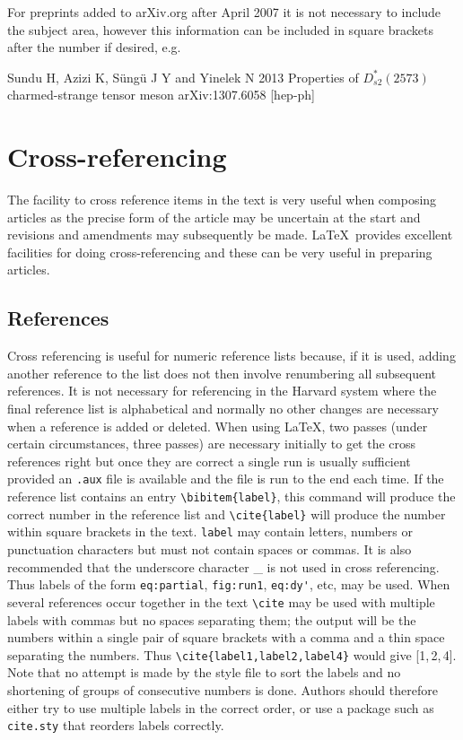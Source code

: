 \documentclass[12pt]{iopart}
\begin{document}
\noindent For preprints added to arXiv.org after April 2007 it is not necessary to include the subject area, however this information can be included in square brackets after the number if desired, e.g.
\item Sundu H, Azizi K, S\"ung\"u J Y and Yinelek N 2013 Properties of $D_{s2}^*(2573)$ charmed-strange tensor meson arXiv:1307.6058 [hep-ph]
\endnumrefs

\section{Cross-referencing\label{xrefs}}
The facility to cross reference items in the text is very useful when
composing articles as the precise form of the article may be uncertain at the start
and  revisions and amendments may subsequently be made.
\LaTeX\ provides excellent facilities for doing cross-referencing
and these can be very useful in preparing articles.

\subsection{References}
\label{refs}
Cross referencing is useful for numeric reference lists because, if it
is used, adding
another reference to the list does not then involve renumbering all
subsequent references. It is not necessary for referencing
in the Harvard system where the final reference list is alphabetical
and normally no other changes are necessary when a reference is added or
deleted.
When using \LaTeX , two passes (under certain circumstances, three passes)
are necessary initially to get the cross references right
but once they are correct a single run is usually sufficient provided an
\verb".aux" file is available and the file
is run to the end each time.
If the
reference list contains an entry \verb"\bibitem{label}",
this command
will produce the correct number in the reference list and
\verb"\cite{label}" will produce the number within square brackets in the
text. \verb"label" may contain letters, numbers
or punctuation characters but must not contain spaces or commas. It is also
recommended that the underscore character \_{} is not used in cross
referencing.
Thus labels of the form
\verb"eq:partial", \verb"fig:run1", \verb"eq:dy'",
etc, may be used. When several
references occur together in the text \verb"\cite" may be used with
multiple labels with commas but no spaces separating them;
the output will be the
numbers within a single pair of square brackets with a comma and a
thin space separating the numbers. Thus \verb"\cite{label1,label2,label4}"
would give [1,\,2,\,4]. Note that no attempt is made by the style file to sort the
labels and no shortening of groups of consecutive numbers is done.
Authors should therefore either try to use multiple labels in the correct
order, or use a package such as \verb"cite.sty" that reorders labels
correctly.
\end{document}
